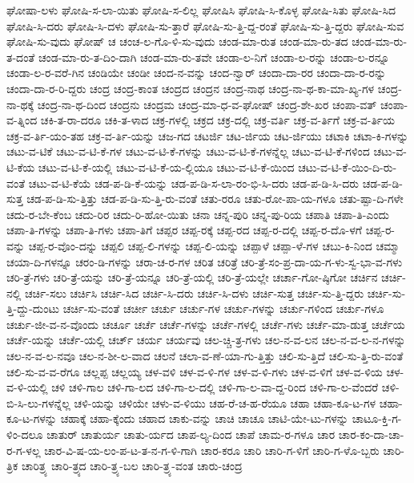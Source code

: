 {ಘೋಷಾ-ಲಳು
ಘೋಷಿ-ಸ-ಲಾ-ಯಿತು
ಘೋಷಿ-ಸ-ಲಿಲ್ಲ
ಘೋಷಿಸಿ
ಘೋಷಿ-ಸಿ-ಕೊಳ್ಳ
ಘೋಷಿ-ಸಿತು
ಘೋಷಿ-ಸಿದ
ಘೋಷಿ-ಸಿ-ದರು
ಘೋಷಿ-ಸಿ-ದಳು
ಘೋಷಿ-ಸು-ತ್ತಾರೆ
ಘೋಷಿ-ಸು-ತ್ತಿ-ದ್ದ-ರಂತೆ
ಘೋಷಿ-ಸು-ತ್ತಿ-ದ್ದರು
ಘೋಷಿ-ಸುವ
ಘೋಷಿ-ಸು-ವುದು
ಘೋಷ್
ಚ
ಚಂಚ-ಲ-ಗೊ-ಳಿ-ಸು-ವುದು
ಚಂಡ-ಮಾ-ರುತ
ಚಂಡ-ಮಾ-ರು-ತದ
ಚಂಡ-ಮಾ-ರು-ತ-ದಂತೆ
ಚಂಡ-ಮಾ-ರು-ತ-ದಿಂ-ದಾಗಿ
ಚಂಡ-ಮಾ-ರು-ತವೇ
ಚಂಡಾ-ಲ-ನಿಗೆ
ಚಂಡಾ-ಲ-ರನ್ನು
ಚಂಡಾ-ಲ-ರನ್ನೂ
ಚಂಡಾ-ಲ-ರ-ವರೆ-ಗಿನ
ಚಂಡಿಯೇ
ಚಂಡೀ
ಚಂದ-ನ-ವನ್ನು
ಚಂದ-ನ್ವಾರ್
ಚಂದಾ-ದಾ-ರರ
ಚಂದಾ-ದಾ-ರ-ರನ್ನು
ಚಂದಾ-ದಾ-ರ-ರಿ-ದ್ದರು
ಚಂದ್ರ
ಚಂದ್ರ-ಕಾಂತ
ಚಂದ್ರದ
ಚಂದ್ರನ
ಚಂದ್ರ-ನಾಥ
ಚಂದ್ರ-ನಾ-ಥ-ಕಾ-ಮಾ-ಖ್ಯ-ಗಳ
ಚಂದ್ರ-ನಾ-ಥಕ್ಕೆ
ಚಂದ್ರ-ನಾ-ಥ-ದಿಂದ
ಚಂದ್ರನು
ಚಂದ್ರಮ
ಚಂದ್ರ-ಮಾ-ಧ-ವ-ಘೋಷ್
ಚಂದ್ರ-ಶೇ-ಖರ
ಚಂಪಾ-ವತ್
ಚಂಪಾ-ವ-ತ್ನಿಂದ
ಚಕಿ-ತ-ರಾ-ದರೂ
ಚಕಿ-ತ-ಳಾದ
ಚಕ್ರ-ಗಳಲ್ಲಿ
ಚಕ್ರದ
ಚಕ್ರ-ದಲ್ಲಿ
ಚಕ್ರ-ವರ್ತಿ
ಚಕ್ರ-ವ-ರ್ತಿಗೆ
ಚಕ್ರ-ವ-ರ್ತಿಯ
ಚಕ್ರ-ವ-ರ್ತಿ-ಯಂ-ತಹ
ಚಕ್ರ-ವ-ರ್ತಿ-ಯನ್ನು
ಚಜ-ಗದ
ಚಟರ್ಜಿ
ಚಟ-ರ್ಜಿಯ
ಚಟ-ರ್ಜಿಯು
ಚಟಾಕಿ
ಚಟಾ-ಕಿ-ಗಳನ್ನು
ಚಟು-ವ-ಟಿಕೆ
ಚಟು-ವ-ಟಿ-ಕೆ-ಗಳ
ಚಟು-ವ-ಟಿ-ಕೆ-ಗಳನ್ನು
ಚಟು-ವ-ಟಿ-ಕೆ-ಗಳನ್ನೆಲ್ಲ
ಚಟು-ವ-ಟಿ-ಕೆ-ಗಳಿಂದ
ಚಟು-ವ-ಟಿ-ಕೆಯ
ಚಟು-ವ-ಟಿ-ಕೆ-ಯಲ್ಲಿ
ಚಟು-ವ-ಟಿ-ಕೆ-ಯ-ಲ್ಲಿಯೂ
ಚಟು-ವ-ಟಿ-ಕೆ-ಯಿಂದ
ಚಟು-ವ-ಟಿ-ಕೆ-ಯಿಂ-ದಿ-ರು-ವಂತೆ
ಚಟು-ವ-ಟಿ-ಕೆಯೆ
ಚಡ-ಪ-ಡಿ-ಕೆ-ಯನ್ನು
ಚಡ-ಪ-ಡಿ-ಸ-ಲಾ-ರಂ-ಭಿ-ಸಿ-ದರು
ಚಡ-ಪ-ಡಿ-ಸಿ-ದರು
ಚಡ-ಪ-ಡಿ-ಸುತ್ತ
ಚಡ-ಪ-ಡಿ-ಸು-ತ್ತಿತ್ತು
ಚಡ-ಪ-ಡಿ-ಸು-ತ್ತಿ-ರು-ವಂತೆ
ಚತು-ರರೂ
ಚತು-ರೋ-ಪಾ-ಯ-ಗಳೂ
ಚತು-ಷ್ಪಾ-ದಿ-ಗಳೇ
ಚದು-ರ-ಬೇ-ಕೆಂಬ
ಚದು-ರಿರ
ಚದು-ರಿ-ಹೋ-ಯಿತು
ಚನಾ
ಚನ್ನ-ಪುರಿ
ಚನ್ನ-ಪು-ರಿಯ
ಚಪಾತಿ
ಚಪಾ-ತಿ-ಎಂದು
ಚಪಾ-ತಿ-ಗಳನ್ನು
ಚಪಾ-ತಿ-ಗಳು
ಚಪಾ-ತಿಗೆ
ಚಪ್ಪರ
ಚಪ್ಪ-ರಕ್ಕೆ
ಚಪ್ಪ-ರದ
ಚಪ್ಪ-ರ-ದಲ್ಲಿ
ಚಪ್ಪ-ರ-ದೊ-ಳಗೆ
ಚಪ್ಪ-ರ-ವನ್ನು
ಚಪ್ಪ-ರ-ವೊಂ-ದನ್ನು
ಚಪ್ಪಲಿ
ಚಪ್ಪ-ಲಿ-ಗಳನ್ನು
ಚಪ್ಪ-ಲಿ-ಯನ್ನು
ಚಪ್ಪಾಳೆ
ಚಪ್ಪಾ-ಳೆ-ಗಳ
ಚಬು-ಕಿ-ನಿಂದ
ಚಮ್ಮಾ
ಚಯಾ-ದಿ-ಗಳನ್ನೂ
ಚರಂ-ಡಿ-ಗಳನ್ನು
ಚರಾ-ಚ-ರ-ಗಳ
ಚರಿತ
ಚರಿತ್ರೆ
ಚರಿ-ತ್ರೆ-ಸಂ-ಪ್ರ-ದಾ-ಯ-ಗ-ಳು-ಸ್ವ-ಭಾ-ವ-ಗಳು
ಚರಿ-ತ್ರೆ-ಗಳು
ಚರಿ-ತ್ರೆ-ಯನ್ನು
ಚರಿ-ತ್ರೆ-ಯನ್ನೂ
ಚರಿ-ತ್ರೆ-ಯಲ್ಲಿ
ಚರಿ-ತ್ರೆ-ಯಲ್ಲೇ
ಚರ್ಚಾ-ಗೋ-ಷ್ಠಿಗೋ
ಚರ್ಚಿನ
ಚರ್ಚಿ-ನಲ್ಲಿ
ಚರ್ಚಿ-ಸಲು
ಚರ್ಚಿಸಿ
ಚರ್ಚಿ-ಸಿದ
ಚರ್ಚಿ-ಸಿ-ದರು
ಚರ್ಚಿ-ಸಿ-ದಳು
ಚರ್ಚಿ-ಸುತ್ತ
ಚರ್ಚಿ-ಸು-ತ್ತಿ-ದ್ದರು
ಚರ್ಚಿ-ಸು-ತ್ತಿ-ದ್ದು-ದುಂಟು
ಚರ್ಚಿ-ಸು-ವಂತೆ
ಚರ್ಚೀ
ಚರ್ಚು
ಚರ್ಚು-ಗಳ
ಚರ್ಚು-ಗಳನ್ನು
ಚರ್ಚು-ಗಳಿಂದ
ಚರ್ಚು-ಗಳೂ
ಚರ್ಚು-ಜೀ-ವ-ನ-ವೊಂದು
ಚರ್ಚೂ
ಚರ್ಚೆ
ಚರ್ಚೆ-ಗಳನ್ನು
ಚರ್ಚೆ-ಗಳಲ್ಲಿ
ಚರ್ಚೆ-ಗಳು
ಚರ್ಚೆ-ಮಾ-ಡುತ್ತ
ಚರ್ಚೆಯ
ಚರ್ಚೆ-ಯನ್ನು
ಚರ್ಚೆ-ಯಲ್ಲಿ
ಚರ್ಚ್
ಚರ್ಯ
ಚರ್ಯವು
ಚಲ-ಚ್ಚಿ-ತ್ರ-ಗಳು
ಚಲ-ನ-ವ-ಲನ
ಚಲ-ನ-ವ-ಲ-ನ-ಗಳನ್ನು
ಚಲ-ನ-ವ-ಲ-ನವೂ
ಚಲ-ನ-ಶೀ-ಲ-ವಾದ
ಚಲನೆ
ಚಲಾ-ವ-ಣೆ-ಯಾ-ಗು-ತ್ತಿತ್ತು
ಚಲಿ-ಸು-ತ್ತಿದೆ
ಚಲಿ-ಸು-ತ್ತಿ-ರು-ವಂತೆ
ಚಲಿ-ಸು-ವ-ವ-ರೆಗೂ
ಚಲ್ಲಪ್ಪ
ಚಲ್ಲಯ್ಯ
ಚಳ-ವಳಿ
ಚಳ-ವ-ಳಿ-ಗಳ
ಚಳ-ವ-ಳಿ-ಗಳು
ಚಳ-ವ-ಳಿಗೆ
ಚಳ-ವ-ಳಿಯ
ಚಳ-ವ-ಳಿ-ಯಲ್ಲಿ
ಚಳಿ
ಚಳಿ-ಗಾಲ
ಚಳಿ-ಗಾ-ಲದ
ಚಳಿ-ಗಾ-ಲ-ದಲ್ಲಿ
ಚಳಿ-ಗಾ-ಲ-ವಾ-ದ್ದ-ರಿಂದ
ಚಳಿ-ಗಾ-ಲ-ವೆಂದರೆ
ಚಳಿ-ಬಿ-ಸಿ-ಲು-ಗಳನ್ನೆಲ್ಲ
ಚಳಿ-ಯನ್ನು
ಚಳಿಯೇ
ಚಳು-ವ-ಳಿಯು
ಚಹ-ರೆ-ಚ-ಹ-ರೆಯೂ
ಚಹಾ
ಚಹಾ-ಕೂ-ಟ-ಗಳ
ಚಹಾ-ಕೂ-ಟ-ಗಳನ್ನು
ಚಹಾಕ್ಕೆ
ಚಹಾ-ಕ್ಕೆಂದು
ಚಹಾದ
ಚಾಕು-ವನ್ನು
ಚಾಚಿ
ಚಾಚೂ
ಚಾಟಿ-ಯೇ-ಟು-ಗಳನ್ನು
ಚಾಟೂ-ಕ್ತಿ-ಗ-ಳಿಂ-ದಲೂ
ಚಾತುರ್
ಚಾತುರ್ಯ
ಚಾತು-ರ್ಯದ
ಚಾಪ-ಲ್ಯ-ದಿಂದ
ಚಾಪೆ
ಚಾಮ-ರ-ಗಳೂ
ಚಾರ
ಚಾರ-ಕಂ-ದಾ-ಚಾ-ರ-ಗ-ಳಲ್ಲ
ಚಾರ-ವಿ-ಷ-ಯ-ಲಂ-ಪ-ಟ-ತ-ನ-ಗ-ಳಿ-ಗಾಗಿ
ಚಾರ-ಕರೂ
ಚಾರಿ
ಚಾರಿ-ಗ-ಳಿಗೆ
ಚಾರಿ-ಗ-ಳೊ-ಬ್ಬರು
ಚಾರಿ-ತ್ರಿಕ
ಚಾರಿತ್ರ್ಯ
ಚಾರಿ-ತ್ರ್ಯದ
ಚಾರಿ-ತ್ರ್ಯ-ಬಲ
ಚಾರಿ-ತ್ರ್ಯ-ವಂತ
ಚಾರು-ಚಂದ್ರ
}
